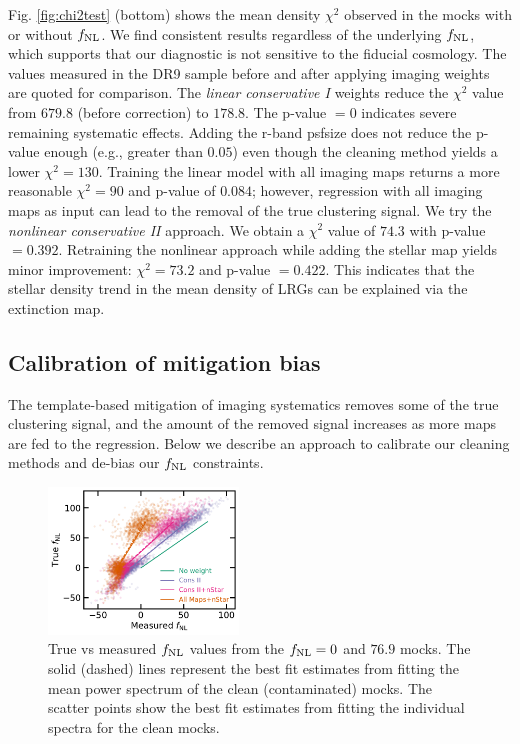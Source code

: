 Fig. \ref{fig:chi2test} (bottom) shows the mean density $\chi^{2}$ observed in the mocks with or without $f_{\rm NL}$. We find consistent results regardless of the underlying $f_{\rm NL}$, which supports that our diagnostic is not sensitive to the fiducial cosmology. The values measured in the DR9 sample before and after applying imaging weights are quoted for comparison. The \textit{linear conservative I} weights reduce the $\chi^{2}$ value from $679.8$ (before correction) to $178.8$. The p-value $=0$ indicates severe remaining systematic effects. Adding the r-band psfsize does not reduce the p-value enough (e.g., greater than $0.05$) even though the cleaning method yields a lower $\chi^{2}=130$. Training the linear model with all imaging maps returns a more reasonable $\chi^{2}=90$ and p-value of $0.084$; however, regression with all imaging maps as input can lead to the removal of the true clustering signal. We try the \textit{nonlinear conservative II} approach. We obtain a $\chi^{2}$ value of $74.3$ with p-value $=0.392$. Retraining the nonlinear approach while adding the stellar map yields minor improvement: $\chi^{2}=73.2$ and p-value $=0.422$.  This indicates that the stellar density trend in the mean density of LRGs can be explained via the extinction map.


\subsection{Calibration of mitigation bias}
The template-based mitigation of imaging systematics removes some of the true clustering signal, and the amount of the removed signal increases as more maps are fed to the regression. Below we describe an approach to calibrate our cleaning methods and de-bias our $f_{\rm NL}$ constraints. 

\begin{figure}
\centering
\includegraphics[width=0.45\textwidth]{figures/fnlbias}
\caption{True vs measured $f_{\rm NL}$ values from the $f_{\rm NL}=0$ and $76.9$ mocks. The solid (dashed) lines represent the best fit estimates from fitting the mean power spectrum of the clean (contaminated) mocks. The scatter points show the best fit estimates from fitting the individual spectra for the clean mocks.}\label{fig:fnlbias}
\end{figure}

